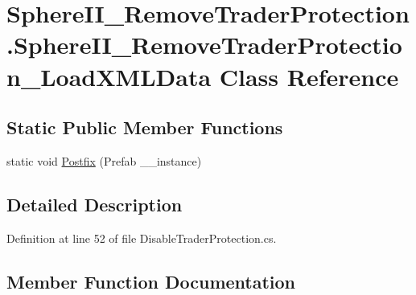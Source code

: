 \hypertarget{class_sphere_i_i___remove_trader_protection_1_1_sphere_i_i___remove_trader_protection___load_x_m_l_data}{}\section{Sphere\+I\+I\+\_\+\+Remove\+Trader\+Protection.\+Sphere\+I\+I\+\_\+\+Remove\+Trader\+Protection\+\_\+\+Load\+X\+M\+L\+Data Class Reference}
\label{class_sphere_i_i___remove_trader_protection_1_1_sphere_i_i___remove_trader_protection___load_x_m_l_data}
\subsection*{Static Public Member Functions}
\begin{DoxyCompactItemize}
\item 
static void \mbox{\hyperlink{class_sphere_i_i___remove_trader_protection_1_1_sphere_i_i___remove_trader_protection___load_x_m_l_data_a04f516b91bfe814b47ca920bbebba8a0}{Postfix}} (Prefab \+\_\+\+\_\+instance)
\end{DoxyCompactItemize}


\subsection{Detailed Description}


Definition at line 52 of file Disable\+Trader\+Protection.\+cs.



\subsection{Member Function Documentation}
\mbox{\label{class_sphere_i_i___remove_trader_protection_1_1_sphere_i_i___remove_trader_protection___load_x_m_l_data_a04f516b91bfe814b47ca920bbebba8a0}} 
